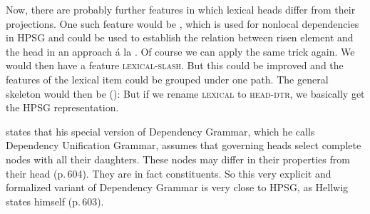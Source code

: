 Now, there are probably further features in which lexical heads differ from their projections. 
One such feature
would be \slasch, which is used for nonlocal dependencies in HPSG and could be used to establish the
relation between risen element and the head in an approach \'{a} la \citet{GO2009a}. Of course we can apply the same trick again. We
would then have a feature \textsc{lexical-slash}. But this could be improved and the features of the
lexical item could be grouped under one path. The general skeleton would then be ():
\ea
{}
\z
But if we rename \textsc{lexical} to \textsc{head-dtr}, we basically get the HPSG
representation. 

\citet[]{Hellwig2003a} states that his special version of Dependency Grammar,
which he calls Dependency Unification Grammar, assumes that
governing heads select complete nodes with all their daughters. These nodes may differ in their
properties from their head (p.\,604). They are in fact constituents. So this very explicit and
formalized variant of Dependency Grammar is very close to HPSG, as Hellwig states himself (p.\,603).

